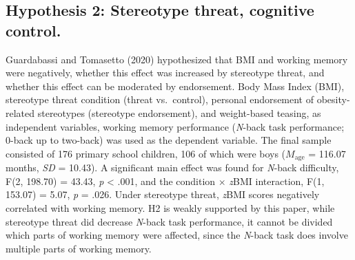 \documentclass[
  stu, a4paper,floatsintext]{apa7}
\begin{document}
\subsection{Hypothesis 2: Stereotype threat, cognitive control.}\label{hypothesis-2-stereotype-threat-cognitive-control.}

Guardabassi and Tomasetto (2020) hypothesized that BMI and working memory were negatively, whether this effect was increased by stereotype threat, and whether this effect can be moderated by endorsement.
Body Mass Index (BMI), stereotype threat condition (threat vs.~control), personal endorsement of obesity-related stereotypes (stereotype endorsement), and weight-based teasing, as independent variables, working memory performance (\emph{N}-back task performance; 0-back up to two-back) was used as the dependent variable.
The final sample consisted of 176 primary school children, 106 of which were boys (\(M_{\text{age}}\) = 116.07 months, \emph{SD} = 10.43).
A significant main effect was found for \emph{N}-back difficulty, F(2, 198.70) = 43.43, \emph{p} \textless{} .001, and the condition \(\times\) \emph{z}BMI interaction, F(1, 153.07) = 5.07, \emph{p} = .026.
Under stereotype threat, \emph{z}BMI scores negatively correlated with working memory.
H2 is weakly supported by this paper, while stereotype threat did decrease \emph{N}-back task performance, it cannot be divided which parts of working memory were affected, since the \emph{N}-back task does involve multiple parts of working memory.
\end{document}
